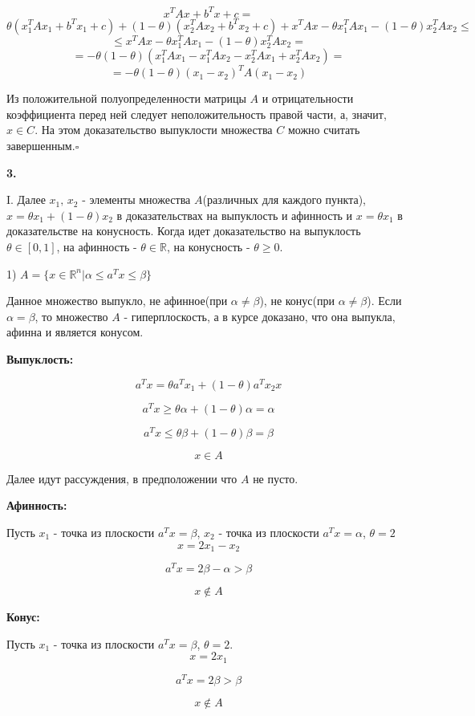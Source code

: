 \documentclass[12pt]{article}
\begin{document}
$$x^TAx+b^Tx+c=$$
$$\theta(x_1^TAx_1+b^Tx_1+c) +(1-\theta)(x_2^TAx_2+b^Tx_2+c) + x^TAx - \theta x_1^TAx_1 - (1-\theta)x_2^TAx_2 \leq$$
$$\leq x^TAx - \theta x_1^TAx_1 - (1-\theta)x_2^TAx_2=$$
$$=-\theta(1-\theta)(x_1^TAx_1-x_1^TAx_2-x_2^TAx_1+x_2^TAx_2)=$$
$$=-\theta(1-\theta)(x_1-x_2)^TA(x_1-x_2)$$


Из положительной полуопределенности матрицы $A$ и отрицательности коэффициента перед ней следует неположительность правой части, а, значит, $x \in C$. На этом доказательство выпуклости множества $C$ можно считать завершенным.$\square$

\begin{center}
	\textbf{3.}
\end{center}

I. Далее $x_1,\,x_2$ - элементы множества $A$(различных для каждого пункта), $x = \theta x_1+(1-\theta)x_2$ в доказательствах на выпуклость и афинность и $x = \theta x_1$ в доказательстве на конусность. Когда идет доказательство на выпуклость $\theta \in [0,1]$, на афинность - $\theta \in \mathbb{R}$, на конусность - $\theta \geq 0$.

1) $A = \{x\in \mathbb{R}^n|\alpha\leq a^Tx\leq \beta\}$

Данное множество выпукло, не афинное(при $\alpha \neq \beta$), не конус(при $\alpha \neq \beta$). Если $\alpha = \beta$, то множество $A$ - гиперплоскость, а в курсе доказано, что она выпукла, афинна и является конусом.

\textbf{Выпуклость:}

$$a^Tx = \theta a^Tx_1 + (1-\theta)a^Tx_2x$$

$$a^Tx \geq \theta \alpha + (1 - \theta)\alpha = \alpha$$

$$a^Tx \leq \theta \beta + (1-\theta)\beta = \beta$$

$$x\in A$$

Далее идут рассуждения, в предположении что $A$ не пусто.

\textbf{Афинность:}

Пусть $x_1$ - точка из плоскости $a^Tx=\beta$, $x_2$ - точка из плоскости $a^Tx=\alpha$, $\theta =2$
$$x = 2x_1 - x_2$$

$$a^Tx = 2\beta - \alpha>\beta$$

$$x \notin A$$


\textbf{Конус:}

Пусть $x_1$ - точка из плоскости $a^Tx=\beta$, $\theta =2$.
$$x = 2x_1$$

$$a^Tx = 2\beta>\beta$$

$$x \notin A$$
\end{document}
